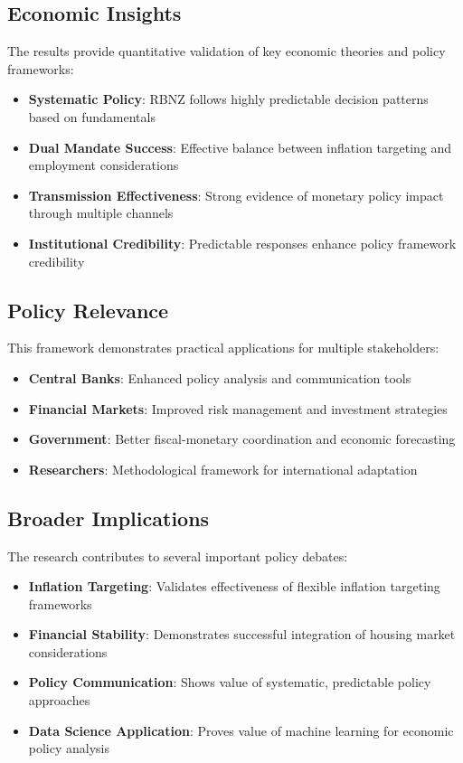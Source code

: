 \documentclass[11pt,a4paper]{article}
\begin{document}
	\subsection{Economic Insights}
	The results provide quantitative validation of key economic theories and policy frameworks:
	\begin{itemize}
		\item \textbf{Systematic Policy}: RBNZ follows highly predictable decision patterns based on fundamentals
		\item \textbf{Dual Mandate Success}: Effective balance between inflation targeting and employment considerations
		\item \textbf{Transmission Effectiveness}: Strong evidence of monetary policy impact through multiple channels
		\item \textbf{Institutional Credibility}: Predictable responses enhance policy framework credibility
	\end{itemize}
	
	\subsection{Policy Relevance}
	This framework demonstrates practical applications for multiple stakeholders:
	\begin{itemize}
		\item \textbf{Central Banks}: Enhanced policy analysis and communication tools
		\item \textbf{Financial Markets}: Improved risk management and investment strategies
		\item \textbf{Government}: Better fiscal-monetary coordination and economic forecasting
		\item \textbf{Researchers}: Methodological framework for international adaptation
	\end{itemize}
	
	\subsection{Broader Implications}
	The research contributes to several important policy debates:
	\begin{itemize}
		\item \textbf{Inflation Targeting}: Validates effectiveness of flexible inflation targeting frameworks
		\item \textbf{Financial Stability}: Demonstrates successful integration of housing market considerations
		\item \textbf{Policy Communication}: Shows value of systematic, predictable policy approaches
		\item \textbf{Data Science Application}: Proves value of machine learning for economic policy analysis
	\end{itemize}
	
\end{document}

